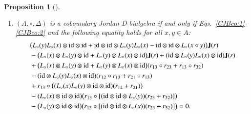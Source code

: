 \documentclass[12pt, reqno, a4paper]{amsart}
\newtheorem{proposition}[theorem]{Proposition}
\theoremstyle{definition}
\newcommand{\id}{\mathrm{id}}
\begin{document}
\begin{proposition}[\cite{hou2022new}]
\begin{enumerate}[label=(\roman*)]
\begin{align*}
			               & + \sum_j \bigl\{ (r_{12} + r_{21}) \circ [(\id \otimes (L_{\circ}(x) L_{\circ}(x_j) - L_{\circ}(x \circ x_j)) \otimes \id) r_{23} ]\bigr\} \otimes y_j.
		      \end{align*}
		\item\label{tdb:co2} $(A, \circ, \Delta)$ is a coboundary Jordan D-bialgebra if and only if Eqs.~\eqref{CJBco:1}-\eqref{CJBco:2} and the following equality holds for all $x, y \in A$:
		      \begin{align}
			       & \bigl( L_{\circ}(y) L_{\circ}(x) \otimes \id \otimes \id + \id \otimes \id \otimes L_{\circ}(y) L_{\circ}(x) - \id \otimes \id \otimes L_{\circ}(x \circ y) \bigr)\mathbf{J}(r) \notag   \\
			       & - \bigl( L_{\circ}(x) \otimes L_{\circ}(y) \otimes \id + L_{\circ}(y) \otimes L_{\circ}(x) \otimes \id \bigr) \mathbf{J}(r)
			      + (\id \otimes L_{\circ}(y) L_{\circ}(x) \otimes \id)\mathbf{J}(r) \notag                                                                                           \\
			       & + \bigl( L_{\circ}(x) \otimes L_{\circ}(y) \otimes \id + L_{\circ}(y) \otimes L_{\circ}(x) \otimes \id \bigr) ( r_{13} \circ r_{23}+ r_{13} \circ r_{32})\notag                  \\
			       & - (\id \otimes L_{\circ}(y) L_{\circ}(x) \otimes \id)( r_{12} \circ r_{13} + r_{21} \circ r_{13} ) \notag                                                        \\
			       & + r_{13} \circ \bigl( (L_{\circ}(x) L_{\circ}(y) \otimes \id \otimes \id )(r_{12} + r_{21}) \bigr) \notag                                                        \\
			       & - (L_{\circ}(x) \otimes \id \otimes \id) \bigl( r_{13} \circ [(\id \otimes \id \otimes L_{\circ}(y))(r_{23} + r_{32})] \bigr) \notag                             \\
			       & - \bigl( L_{\circ}(y) \otimes \id \otimes \id \bigr) \bigl( r_{13} \circ [(\id \otimes \id \otimes L_{\circ}(x))(r_{23} + r_{32})] \bigr) = 0. \label{eq:hou3.6}
		      \end{align}
	\end{enumerate}
\end{proposition}
\end{document}
